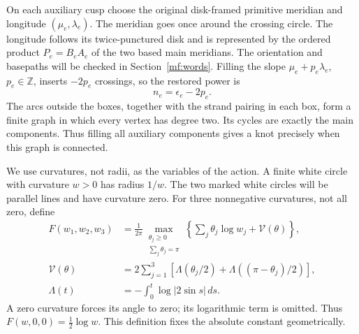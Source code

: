 \documentclass[11pt]{article}
\numberwithin{equation}{section}
\theoremstyle{definition}
\theoremstyle{remark}
\begin{document}
On each auxiliary cusp choose the original disk-framed primitive
meridian and longitude \((\mu_e,\lambda_e)\). The meridian goes once
around the crossing circle. The longitude follows its twice-punctured
disk and is represented by the ordered product \(P_e=B_eA_e\) of the
two based main meridians. The orientation and basepaths will be checked
in Section~\ref{mf:words}. Filling the slope
\(\mu_e+p_e\lambda_e\), \(p_e\in\mathbb Z\), inserts \(-2p_e\)
crossings, so the restored power is
\begin{equation}\label{mf:powers}
                         n_e=\epsilon_e-2p_e.
\end{equation}
The arcs outside the boxes, together with the strand pairing in each
box, form a finite graph in which every vertex has degree two. Its
cycles are exactly the main components. Thus filling all auxiliary
components gives a knot precisely when this graph is connected.

We use curvatures, not radii, as the variables of the action. A finite
white circle with curvature \(w>0\) has radius \(1/w\). The two marked
white circles will be parallel lines and have curvature zero.
For three nonnegative curvatures, not all zero, define
\begin{equation}\label{mf:triangle}
\begin{split}
 F(w_1,w_2,w_3)
 &=\frac1{2\pi}
  \max_{\substack{\theta_j\ge0\\\sum_j\theta_j=\pi}}
      \left\{\sum_j\theta_j\log w_j+\mathcal V(\theta)\right\},\\
 \mathcal V(\theta)
 &=2\sum_{j=1}^3
   \left[\Lambda(\theta_j/2)+
                 \Lambda((\pi-\theta_j)/2)\right],\\
 \Lambda(t)&=-\int_0^t\log|2\sin s|\,ds.
\end{split}
\end{equation}
A zero curvature forces its angle to zero; its logarithmic term is
omitted. Thus \(F(w,0,0)=\frac12\log w\). This definition fixes the
absolute constant geometrically.
\end{document}
